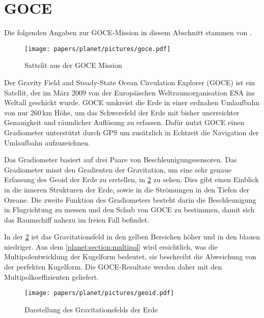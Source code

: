 %
%
%
%
\section{GOCE
\label{planet:section:goce}}

Die folgenden Angaben zur GOCE-Mission in diesem Abschnitt stammen von \cite{planet:goce}.

\begin{figure}[h]
    \centering
    \texttt{[image: papers/planet/pictures/goce.pdf]}
    \caption{Sattelit aus der GOCE Mission \cite{planet:gocepic}
        \label{planet:fig:goce}}
\end{figure}

Der Gravity Field and Steady-State Ocean Circulation Explorer (GOCE) ist ein Satellit, der im März 2009 von der Europäischen Weltraumorganisation ESA ins Weltall geschickt wurde.
GOCE umkreist die Erde in einer erdnahen Umlaufbahn von nur 260\,km Höhe, um das Schwerefeld der Erde mit bisher unerreichter Genauigkeit und räumlicher Auflösung zu erfassen.
Dafür nutzt GOCE einen Gradiometer unterstützt durch GPS um zusätzlich in Echtzeit die Navigation der Umlaufbahn aufzuzeichnen.

Das Gradiometer basiert auf drei Paare von Beschleunigungssensoren.
Das Gradiometer misst den Gradienten der Gravitation, um eine sehr genaue Erfassung des Geoid der Erde zu erstellen, in \cref{planet:fig:geoid} zu sehen.
Dies gibt einen Einblick in die inneren Strukturen der Erde, sowie in die Strömungen in den Tiefen der Ozeane.
Die zweite Funktion des Gradiometers besteht darin die Beschleunigung in Flugrichtung zu messen und den Schub von GOCE zu bestimmen, damit sich das Raumschiff nahezu im freien Fall befindet.

In der \cref{planet:fig:geoid} ist das Gravitationsfeld in den gelben Bereichen höher und in den blauen niedriger.
Aus dem \cref{planet:section:multipol} wird ersichtlich, was die Multipolentwicklung der Kugelform bedeutet, sie beschreibt die Abweichung von der perfekten Kugelform.
Die GOCE-Resultate werden daher mit den Multipolkoeffizienten geliefert.

\begin{figure}[h]
    \centering
    \texttt{[image: papers/planet/pictures/geoid.pdf]}
    \caption{Darstellung des Gravitationsfelds der Erde \cite{planet:geoidpic}
        \label{planet:fig:geoid}}
\end{figure}


